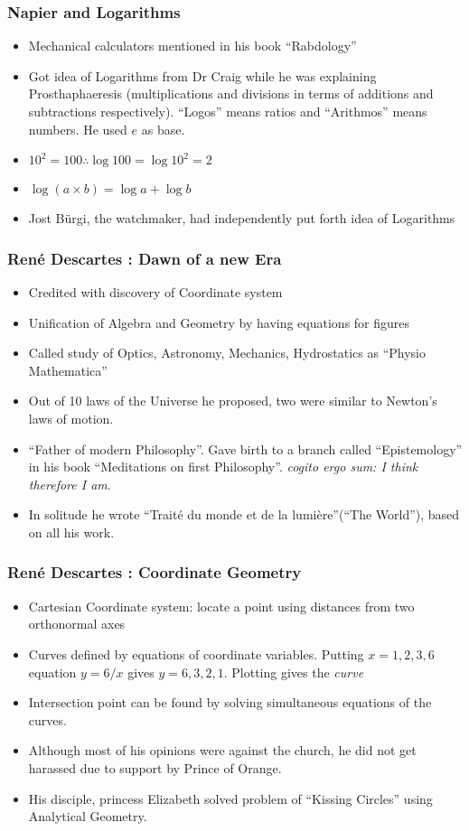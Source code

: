 \begin{frame}[fragile]
\frametitle{Napier and Logarithms}
\begin{itemize}
\item Mechanical calculators mentioned in his book ``Rabdology''
\item Got idea of Logarithms from Dr Craig while he was explaining Prosthaphaeresis (multiplications and divisions in terms of additions and subtractions respectively). ``Logos'' means ratios and ``Arithmos'' means numbers. He used $e$ as base.
\item $10^2 = 100 \therefore \log 100 = \log 10^2 = 2$
\item $\log (a \times b) = \log a + \log b$
\item Jost B\"urgi, the watchmaker, had independently put forth idea of Logarithms
\end{itemize}
\end{frame}


\begin{frame}[fragile]
\frametitle{Ren\'e Descartes : Dawn of a new Era}
\begin{itemize}
\item Credited with discovery of Coordinate system
\item Unification of Algebra and Geometry by  having equations for figures
\item Called study of Optics, Astronomy, Mechanics, Hydrostatics as ``Physio Mathematica''
\item Out of 10 laws of the Universe he proposed, two were similar to Newton's laws of motion.
\item ``Father of modern Philosophy''. Gave birth to a branch called ``Epistemology''  in his book ``Meditations on first Philosophy''. {\em cogito ergo sum: I think therefore I am}.
\item In solitude he wrote ``Trait\'e du monde et de la lumi\`ere''(``The World''), based on all his work.
\end{itemize}
\end{frame}


\begin{frame}[fragile]
\frametitle{Ren\'e Descartes : Coordinate Geometry}
\begin{itemize}
\item Cartesian Coordinate system: locate a point using distances from two orthonormal axes
\item Curves defined by equations of coordinate variables. Putting $x=1,2,3,6$ equation $y=6/x$ gives $y=6,3,2,1$. Plotting gives the {\em curve}
\item Intersection point can be found by solving simultaneous equations of the curves.
\item Although most of his opinions were against the church, he did not get harassed due to support by Prince of Orange.
\item His disciple, princess Elizabeth solved problem of ``Kissing Circles'' using Analytical Geometry.
\end{itemize}
\end{frame}


